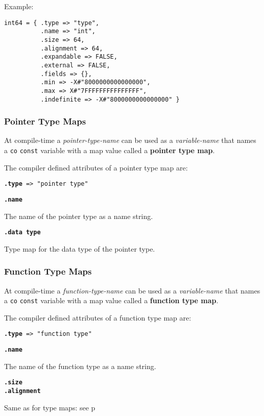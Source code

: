 \documentclass[12pt]{article}
\newcommand{\key}[1]{{\rm \bfseries #1}}
\newcommand{\ttkey}[1]{{\tt \bfseries #1}}
\newcommand{\pagref}[1]{p\pageref{#1}}
\newenvironment{indpar}[1][0.3in]%
	{\begin{list}{}%
		     {\setlength{\itemsep}{0in}%
		      \setlength{\topsep}{0in}%
		      \setlength{\parsep}{1ex}%
		      \setlength{\labelwidth}{#1}%
		      \setlength{\leftmargin}{#1}%
		      \addtolength{\leftmargin}{\labelsep}}%
	 \item}%
	{\end{list}}
\begin{document}
Example:
\begin{indpar}\begin{verbatim}
int64 = { .type => "type",
          .name => "int",
          .size => 64,
          .alignment => 64,
          .expandable => FALSE,
          .external => FALSE,
          .fields => {},
          .min => -X#"8000000000000000",
          .max => X#"7FFFFFFFFFFFFFFF",
          .indefinite => -X#"8000000000000000" }
\end{verbatim}\end{indpar}

\subsubsection{Pointer Type Maps}
\label{POINTER-TYPE-MAPS}

At compile-time a {\em pointer-type-name} can be used as a
{\em variable-name} that names a {\tt co} {\tt const} variable
with a map value called a \key{pointer type map}.

The compiler defined attributes of a pointer type map are:

{\tt \ttkey{.type} => "pointer type"}

\ttkey{.name}
\begin{indpar}
The name of the pointer type as a name string.
\end{indpar}

\ttkey{.data type}
\begin{indpar}
Type map for the data type of the pointer type.
\end{indpar}

\subsubsection{Function Type Maps}
\label{FUNCTION-TYPE-MAPS}

At compile-time a {\em function-type-name} can be used as a
{\em variable-name} that names a {\tt co} {\tt const} variable
with a map value called a \key{function type map}.

The compiler defined attributes of a function type map are:

{\tt \ttkey{.type} => "function type"}

\ttkey{.name}
\begin{indpar}
The name of the function type as a name string.
\end{indpar}

\ttkey{.size} \\
\ttkey{.alignment}
\begin{indpar}
Same as for type maps: see \pagref{SIZE-AND-ALIGNMENT}
\end{indpar}
\end{document}
